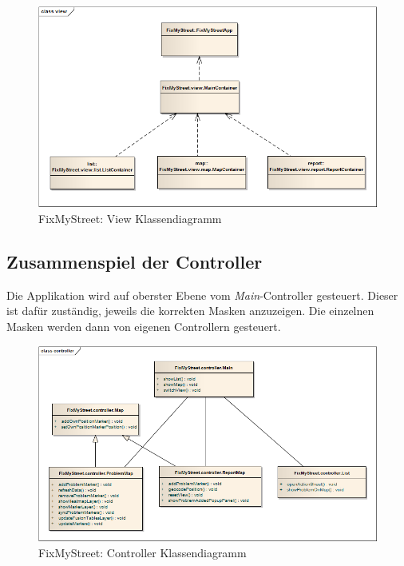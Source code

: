 \begin{figure}[H]
	\centering
	\includegraphics[width=\textwidth]{images/usecase2-fixmystreet/uml/fixmystreet-view-classmodel}
	\caption{FixMyStreet: View Klassendiagramm}
	\label{fixmystreet-view-classmodel}
\end{figure}


\subsection{Zusammenspiel der Controller}
Die Applikation wird auf oberster Ebene vom \emph{Main}-Controller gesteuert. Dieser ist dafür zuständig, jeweils die korrekten Masken anzuzeigen. Die einzelnen Masken werden dann von eigenen Controllern gesteuert.

\begin{figure}[H]
	\centering
	\includegraphics[width=\textwidth]{images/usecase2-fixmystreet/uml/fixmystreet-controller-classmodel}
	\caption{FixMyStreet: Controller Klassendiagramm}
	\label{fixmystreet-controller-classmodel}
\end{figure}

